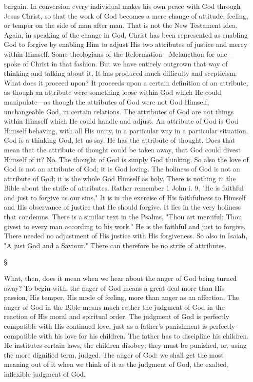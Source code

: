 \documentclass[12pt,a5paper,twoside,titlepage]{book}
\begin{document}
bargain. In conversion every individual makes 
his own peace with God through Jesus Christ, 
so that the work of God becomes a mere change 
of attitude, feeling, or temper on the side of man 
after man. That is not the New Testament idea. 
Again, in speaking of the change in God, Christ 
has been represented as enabling God to forgive 
by enabling Him to adjust His two attributes of 
justice and mercy within Himself. Some theologians 
of the Reformation---Melancthon for one---spoke 
of Christ in that fashion. But we have 
entirely outgrown that way of thinking and 
talking about it. It has produced much difficulty 
and scepticism. What does it proceed 
upon? It proceeds upon a certain definition 
of an attribute, as though an attribute were 
something loose within God which He could 
manipulate---as though the attributes of God 
were not God Himself, unchangeable God, in 
certain relations. The attributes of God are 
not things within Himself which He could 
handle and adjust. An attribute of God is God 
Himself behaving, with all His unity, in a particular 
way in a particular situation. God is 
a thinking God, let us say. He has the attribute 
of thought. Does that mean that the 
attribute of thought could be taken away, 
that God could divest Himself of it? No. The 
thought of God is simply God thinking. So 
also the love of God is not an attribute of 
God; it is God loving. The holiness of God 
is not an attribute of God; it is the whole 
God Himself as holy. There is nothing in the 
Bible about the strife of attributes. Rather 
remember 1 John i. 9, "He is faithful and just 
to forgive us our sins." It is in the exercise of 
His faithfulness to Himself and His observance 
of justice that He should forgive. It lies in 
the very holiness that condemns. There is a 
similar text in the Psalms, "Thou art merciful; 
Thou givest to every man according to his 
work." He is the faithful and just to forgive. 
There needed no adjustment of His justice with 
His forgiveness. So also in Isaiah, "A just God 
and a Saviour." There can therefore be no strife 
of attributes. 

\begin{center}
\S
\end{center}

What, then, does it mean when we hear about 
the anger of God being turned away? To begin 
with, the anger of God means a great deal more 
than His passion, His temper, His mode of 
feeling, more than anger as an affection. The 
anger of God in the Bible means much rather 
the judgment of God in the reaction of His 
moral and spiritual order. The judgment of God 
is perfectly compatible with His continued love, 
just as a father's punishment is perfectly compatible 
with his love for his children. The 
father has to discipline his children. He institutes 
certain laws, the children disobey; they 
must be punished, or, using the more dignified 
term, judged. The anger of God: we shall get 
the most meaning out of it when we think of it 
as the judgment of God, the exalted, inflexible 
judgment of God. 
\end{document}

